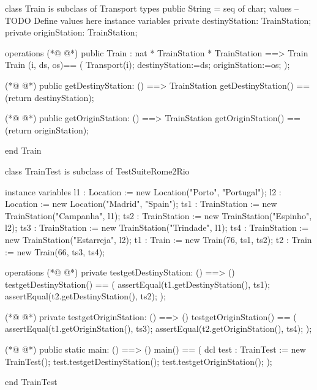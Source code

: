 \begin{vdmpp}[breaklines=true]
class Train is subclass of Transport
types
public String = seq of char;
values
-- TODO Define values here
instance variables
private destinyStation: TrainStation;
private originStation: TrainStation;

operations
(*@
\label{Train:11}
@*)
public Train : nat * TrainStation * TrainStation ==> Train
Train (i, ds, os)== (
 Transport(i);
 destinyStation:=ds;
 originStation:=os;
 );
 

  
(*@
\label{getDestinyStation:20}
@*)
public getDestinyStation: () ==> TrainStation
 getDestinyStation() == (return destinyStation);
 
(*@
\label{getOriginStation:23}
@*)
public getOriginStation: () ==> TrainStation
 getOriginStation() == (return originStation);


end Train

class TrainTest is subclass of TestSuiteRome2Rio

 instance variables
 l1 :  Location := new Location("Porto", "Portugal");
 l2 : Location := new Location("Madrid", "Spain");
 ts1 : TrainStation := new TrainStation("Campanha", l1);
 ts2 : TrainStation := new TrainStation("Espinho", l2);
 ts3 : TrainStation := new TrainStation("Trindade", l1);
 ts4 : TrainStation := new TrainStation("Estarreja", l2);
 t1 : Train := new Train(76, ts1, ts2);
 t2 : Train := new Train(66, ts3, ts4);
 
 
 operations
(*@
\label{testgetDestinyStation:43}
@*)
  private testgetDestinyStation: () ==> ()
   testgetDestinyStation() == (
    assertEqual(t1.getDestinyStation(), ts1);
    assertEqual(t2.getDestinyStation(), ts2);
   );
   
(*@
\label{testgetOriginStation:49}
@*)
   private testgetOriginStation: () ==> ()
   testgetOriginStation() == (
    assertEqual(t1.getOriginStation(), ts3);
    assertEqual(t2.getOriginStation(), ts4);
   );
   
   
(*@
\label{main:56}
@*)
 public static main: () ==> ()
      main() ==
      (
       dcl test : TrainTest := new TrainTest();
       test.testgetDestinyStation();
       test.testgetOriginStation();
       );
       
end TrainTest
\end{vdmpp}
